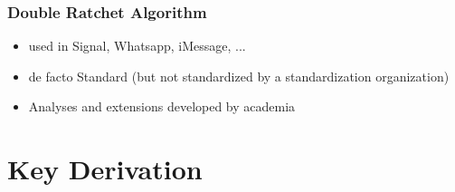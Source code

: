 \documentclass[11pt,a4paper,headinclude,twoside, open=right,numbers=noenddot]{scrreprt}
\begin{document}
\subsection{Double Ratchet Algorithm}
\label{ssec:double_ratchet}

\begin{itemize}
\item used in Signal, Whatsapp, iMessage, ...
\item de facto Standard (but not standardized by a standardization organization)
\item Analyses and extensions developed by academia
\end{itemize}




\chapter{Key Derivation}
\label{chap:key_derivation}
\end{document}
